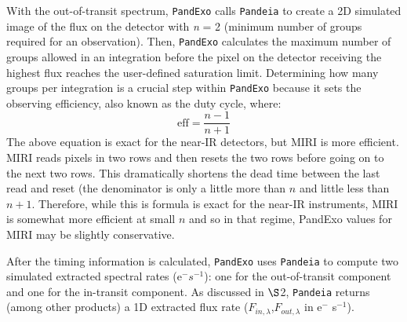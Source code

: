 \documentclass[iop]{emulateapj}
\begin{document}
With the out-of-transit spectrum, \texttt{PandExo} calls \texttt{Pandeia} to create a 2D simulated 
image of the flux on the detector with \emph{n} = 2 (minimum number of groups required
for an observation). Then, \texttt{PandExo} calculates the 
maximum number of groups allowed in an integration before the pixel on 
the detector receiving the highest flux reaches the user-defined saturation limit.
Determining how many groups per integration is a crucial step within \texttt{PandExo} because 
it sets the observing efficiency, also known as the duty cycle, where: 
\begin{equation}
    \textrm{eff} = \frac{n-1}{n+1} 
\end{equation}
The above equation is exact for the near-IR detectors, but MIRI is more efficient. MIRI reads pixels in two rows and then resets the two rows before going on to the next two rows. This dramatically shortens the dead time between the last read and reset (the denominator is only a little more than $n$ and little less than $n+1$. Therefore, while this is formula is exact for the near-IR instruments, MIRI is somewhat more efficient at small $n$ and so in that regime, PandExo values for MIRI may be slightly conservative.

After the timing information is calculated, \texttt{PandExo} uses \texttt{Pandeia} to compute two simulated extracted spectral rates (e$^- s^{-1}$): one for the out-of-transit component and one for the in-transit component. As discussed in $\S$2, \texttt{Pandeia} returns (among other
products) a 1D extracted flux rate ($F_{in,\lambda}$,$F_{out,\lambda}$ in e$^-$ s$^{-1}$). 
\end{document}
